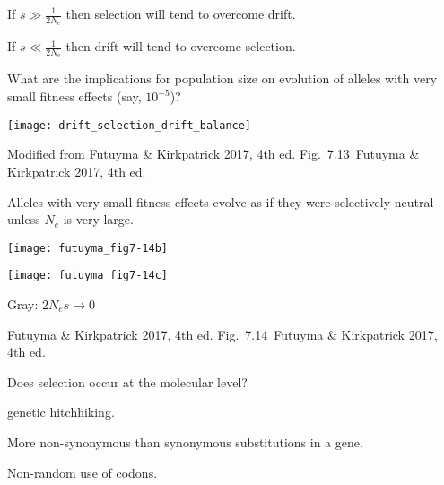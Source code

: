 \documentclass[t]{beamer}
\newcommand{\futuyma}[1]{%
	\ifthenelse{\isempty{#1}}%
	{Futuyma \& Kirkpatrick 2017, 4th ed.}%
	{Fig.~#1~Futuyma \& Kirkpatrick 2017, 4th ed.}%
}
\newcommand{\backskip}{\vspace{-0.5\baselineskip}}
\begin{document}

\begin{frame}
\begin{multicols}{2}
\hangpara If $s\gg\frac{1}{2N_e}$ then selection will tend to overcome drift.

\hangpara If $s\ll\frac{1}{2N_e}$ then drift will tend to overcome selection.

\hangpara What are the implications for population size on evolution of alleles with very small fitness effects (say, $10^{-5}$)?

\columnbreak

\noindent \texttt{[image: drift\_selection\_drift\_balance]}

\end{multicols}

\vfilll

\tinyfill Modified from \futuyma{7.13}

\end{frame}



\begin{frame}{Alleles with very small fitness effects evolve as if they were selectively neutral unless $N_e$ is very large.}

\backskip

\begin{multicols}{2}
\noindent\texttt{[image: futuyma\_fig7-14b]}

\columnbreak

\noindent\texttt{[image: futuyma\_fig7-14c]}
\end{multicols}

Gray: $2N_es \rightarrow 0$

\vfilll

\tinyfill \futuyma{7.14}

\end{frame}



\begin{frame}{Does selection occur at the molecular level?}

\hangpara {} genetic hitchhiking.

\hangpara {} More non-synonymous than synonymous substitutions in a gene.

\hangpara {} Non-random use of codons.

\end{frame}
\end{document}
